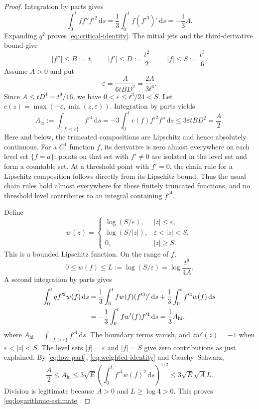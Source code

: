 \documentclass[11pt,a4paper]{article}
\newcommand{\dd}{\,\mathrm{d}}
\begin{document}
\begin{proof}
Integration by parts gives
\[
 \int_0^t ff''f'^2\dd s
 =\frac13\int_0^t f(f'^3)'\dd s=-\frac13 A.
\]
Expanding $q^2$ proves \eqref{eq:critical-identity}.
The initial jets and the third-derivative bound give
\[
 |f''|\le B:=t,\qquad |f'|\le D:=\frac{t^2}{2},\qquad
 |f|\le S:=\frac{t^3}{6}.
\]
Assume $A>0$ and put
\[
 \varepsilon=\frac{A}{6tBD^2}=\frac{2A}{3t^6}.
\]
Since $A\le tD^4=t^9/16$, we have $0<\varepsilon\le t^3/24<S$.
Let $c(z)=\max(-\varepsilon,\min(z,\varepsilon))$.
Integration by parts yields
\begin{equation}\label{eq:low-part}
 A_{\mathrm{lo}}:=\int_{\{|f|<\varepsilon\}}f'^4\dd s
 =-3\int_0^t c(f)f'^2f''\dd s
 \le3\varepsilon tBD^2=\frac A2.
\end{equation}
Here and below, the truncated compositions are Lipschitz and hence
absolutely continuous. For a $C^1$ function $f$, its derivative is zero
almost everywhere on each level set $\{f=a\}$: points on that set with
$f'\ne0$ are isolated in the level set and form a countable set.
At a threshold point with $f'=0$, the chain rule for a Lipschitz composition
follows directly from its Lipschitz bound. Thus the usual chain rules hold
almost everywhere for these finitely truncated functions, and no threshold
level contributes to an integral containing $f'^4$.

Define
\[
 w(z)=
 \begin{cases}
  \log(S/\varepsilon),& |z|\le\varepsilon,\\
  \log(S/|z|),&\varepsilon<|z|<S,\\
  0,&|z|\ge S.
 \end{cases}
\]
This is a bounded Lipschitz function. On the range of $f$,
\[
 0\le w(f)\le L:=\log(S/\varepsilon)=\log\frac{t^9}{4A}.
\]
A second integration by parts gives
\begin{align}
 \int_0^t qf'^2w(f)\dd s
 &=\frac13\int_0^t fw(f)(f'^3)'\dd s
     +\frac13\int_0^t f'^4w(f)\dd s\notag\\
 &=-\frac13\int_0^t fw'(f)f'^4\dd s
   =\frac13 A_{\mathrm{hi}},\label{eq:weighted-identity}
\end{align}
where $A_{\mathrm{hi}}=\int_{\{|f|>\varepsilon\}}f'^4\dd s$.
The boundary terms vanish, and $zw'(z)=-1$ when
$\varepsilon<|z|<S$. The level sets $|f|=\varepsilon$ and $|f|=S$
give zero contributions as just explained.
By \eqref{eq:low-part}, \eqref{eq:weighted-identity} and Cauchy--Schwarz,
\[
 \frac A2\le A_{\mathrm{hi}}
 \le3\sqrt E\left(\int_0^t f'^4w(f)^2\dd s\right)^{1/2}
 \le3\sqrt E\sqrt A L.
\]
Division is legitimate because $A>0$ and $L\ge\log4>0$.
This proves \eqref{eq:logarithmic-estimate}.
\end{proof}
\end{document}
